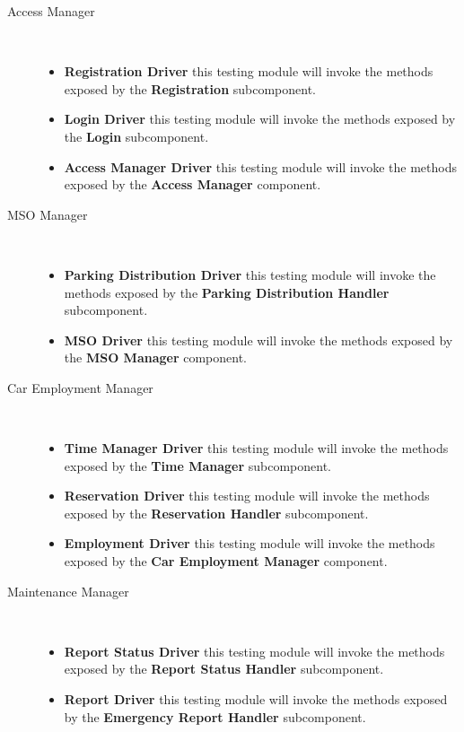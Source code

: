 \begin{description}
		\item[Access Manager]~\\ 
			\begin{itemize}
				\item \textbf{Registration Driver} this testing module will invoke the methods exposed by the \textbf{Registration} subcomponent.
				\item \textbf{Login Driver} this testing module will invoke the methods exposed by the \textbf{Login} subcomponent.
				\item \textbf{Access Manager Driver} this testing module will invoke the methods exposed by the \textbf{Access Manager} component.
			\end{itemize}
		\item[MSO Manager]~\\
			\begin{itemize}
				\item \textbf{Parking Distribution Driver} this testing module will invoke the methods exposed by the \textbf{Parking Distribution Handler} subcomponent.
				\item \textbf{MSO Driver} this testing module will invoke the methods exposed by the \textbf{MSO Manager} component.
			\end{itemize}
		\item[Car Employment Manager]~\\
			\begin{itemize}
				\item \textbf{Time Manager Driver} this testing module will invoke the methods exposed by the \textbf{Time Manager} subcomponent.
				\item \textbf{Reservation Driver} this testing module will invoke the methods exposed by the \textbf{Reservation Handler} subcomponent.
				\item \textbf{Employment Driver} this testing module will invoke the methods exposed by the \textbf{Car Employment Manager} component.
			\end{itemize}
		\item[Maintenance Manager]~\\
			\begin{itemize}
				\item \textbf{Report Status Driver} this testing module will invoke the methods exposed by the \textbf{Report Status Handler} subcomponent.
				\item \textbf{Report Driver} this testing module will invoke the methods exposed by the \textbf{Emergency Report Handler} subcomponent.

\end{itemize}
\end{description}
